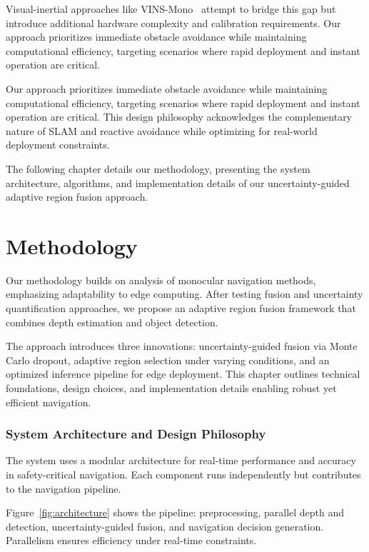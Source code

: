 \documentclass[12pt,oneside]{book}
\newcommand{\figref}[1]{Figure~\ref{#1}}
\begin{document}
Visual-inertial approaches like VINS-Mono~\cite{qin2018vins} attempt to bridge this gap but introduce additional hardware complexity and calibration requirements. Our approach prioritizes immediate obstacle avoidance while maintaining computational efficiency, targeting scenarios where rapid deployment and instant operation are critical.

Our approach prioritizes immediate obstacle avoidance while maintaining computational efficiency, targeting scenarios where rapid deployment and instant operation are critical. This design philosophy acknowledges the complementary nature of SLAM and reactive avoidance while optimizing for real-world deployment constraints.

\vspace{12pt}
The following chapter details our methodology, presenting the system architecture, algorithms, and implementation details of our uncertainty-guided adaptive region fusion approach.

\chapter{Methodology}

Our methodology builds on analysis of monocular navigation methods, emphasizing adaptability to edge computing. After testing fusion and uncertainty quantification approaches, we propose an adaptive region fusion framework that combines depth estimation and object detection.

The approach introduces three innovations: uncertainty-guided fusion via Monte Carlo dropout, adaptive region selection under varying conditions, and an optimized inference pipeline for edge deployment. This chapter outlines technical foundations, design choices, and implementation details enabling robust yet efficient navigation.

\subsection{System Architecture and Design Philosophy}

The system uses a modular architecture for real-time performance and accuracy in safety-critical navigation. Each component runs independently but contributes to the navigation pipeline.

\figref{fig:architecture} shows the pipeline: preprocessing, parallel depth and detection, uncertainty-guided fusion, and navigation decision generation. Parallelism ensures efficiency under real-time constraints.
\end{document}
